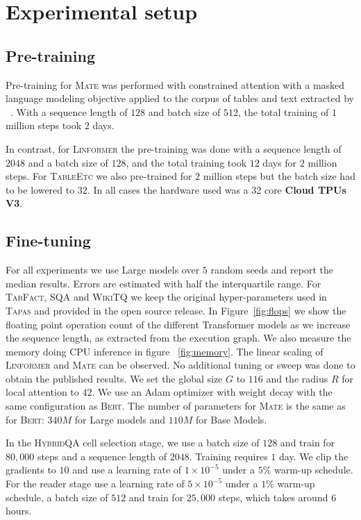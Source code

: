 \documentclass[11pt]{article}
\newcommand\sqa{\textsc{SQA}\xspace}
\newcommand\tabfact{\textsc{TabFact}\xspace}
\newcommand\wtq{\textsc{WikiTQ}\xspace}
\newcommand\hqa{\textsc{HybridQA}\xspace}
\newcommand{\tableetc}{\textsc{TableEtc}\xspace}
\newcommand{\tapas}{\textsc{Tapas}\xspace}
\newcommand{\linformer}{\textsc{Linformer}\xspace}
\newcommand{\bert}{\textsc{Bert}\xspace}
\newcommand{\model}{\textsc{Mate}\xspace}
\begin{document}
\section{Experimental setup}
\label{sec:apx-exp}

\subsection{Pre-training}

Pre-training for \model was performed with constrained attention with a masked language modeling objective applied to the corpus of tables and text extracted by ~\citet{herzig-etal-2020-tapas}. 
With a sequence length of $128$ and batch size of $512$, the total training of $1$ million steps took $2$ days.

In contrast, for \linformer the pre-training was done with a sequence length of $2048$ and a batch size of $128$, and the total training took $12$ days for $2$ million steps. For \tableetc we also pre-trained for $2$ million steps but the batch size had to be lowered to $32$.
In all cases the hardware used was a 32 core \textbf{Cloud TPUs V3}.

\subsection{Fine-tuning}

For all experiments we use Large models over $5$ random seeds and report the median results. Errors are estimated with half the interquartile range. For \tabfact, \sqa and \wtq we keep the original hyper-parameters used in \tapas and provided in the open source release. In Figure~\ref{fig:flops} we show the floating point operation count of the different Transformer models as we increase the sequence length, as extracted from the execution graph. We also measure the memory doing CPU inference in figure
~\ref{fig:memory}. The linear scaling of \linformer and \model can be observed. 
No additional tuning or sweep was done to obtain the published results. We set the global size $G$ to $116$ and the radius $R$ for local attention to $42$. We use an Adam optimizer with weight decay with the same configuration as \bert.
The number of parameters for \model is the same as for \bert: $340M$ for Large models and $110M$ for Base Models.

In the \hqa cell selection stage, we use a batch size of $128$ and train for $80,000$ steps and a sequence length of $2048$. Training requires $1$ day.
We clip the gradients to $10$ and use a learning rate of $1\times 10^{-5}$ under a $5\%$ warm-up schedule.
For the reader stage use a learning rate of $5\times 10^{-5}$ under a $1\%$ warm-up schedule, a batch size of $512$ and train for $25,000$ steps, which takes around $6$ hours.
\end{document}
